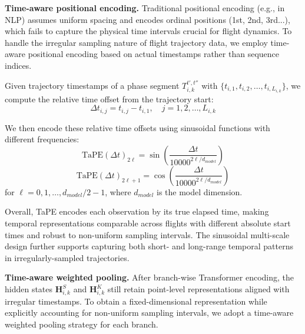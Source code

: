 \documentclass[iicol,pdflatex,sn-basic,Numbered]{sn-jnl}%
\theoremstyle{thmstyleone}%
\theoremstyle{thmstyletwo}%
\theoremstyle{thmstylethree}%
\begin{document}
\textbf{Time-aware positional encoding.} Traditional positional encoding (e.g., in NLP) assumes uniform spacing and encodes ordinal positions (1st, 2nd, 3rd...), which fails to capture the physical time intervals crucial for flight dynamics.
To handle the irregular sampling nature of flight trajectory data, we employ time-aware positional encoding based on actual timestamps rather than sequence indices.

Given trajectory timestamps of a phase segment $T^{t',t''}_{i,k}$ with $\{t_{i,1}, t_{i,2}, \ldots, t_{i,L_{i,k}}\}$, we compute the relative time offset from the trajectory start:
\begin{equation}
\Delta t_{i,j} = t_{i,j} - t_{i,1}, \quad j = 1, 2, \ldots, L_{i,k}
\end{equation}

We then encode these relative time offsets using sinusoidal functions with different frequencies:
\begin{equation}
\mathrm{TaPE}(\Delta t)_{2\ell} = \sin\left(\frac{\Delta t}{10000^{2\ell/d_{model}}}\right)
\end{equation}
\begin{equation}
\mathrm{TaPE}(\Delta t)_{2\ell+1} = \cos\left(\frac{\Delta t}{10000^{2\ell/d_{model}}}\right)
\end{equation}
for $\ell = 0, 1, \ldots, d_{model}/2 - 1$, where $d_{model}$ is the model dimension.

Overall, TaPE encodes each observation by its true elapsed time, making temporal representations comparable across flights with different absolute start times and robust to non-uniform sampling intervals. The sinusoidal multi-scale design further supports capturing both short- and long-range temporal patterns in irregularly-sampled trajectories.

\textbf{Time-aware weighted pooling.} After branch-wise Transformer encoding, the hidden states $\mathbf{H}_{i,k}^S$ and $\mathbf{H}_{i,k}^K$ still retain point-level representations aligned with irregular timestamps.
To obtain a fixed-dimensional representation while explicitly accounting for non-uniform sampling intervals, we adopt a time-aware weighted pooling strategy for each branch.
\end{document}
